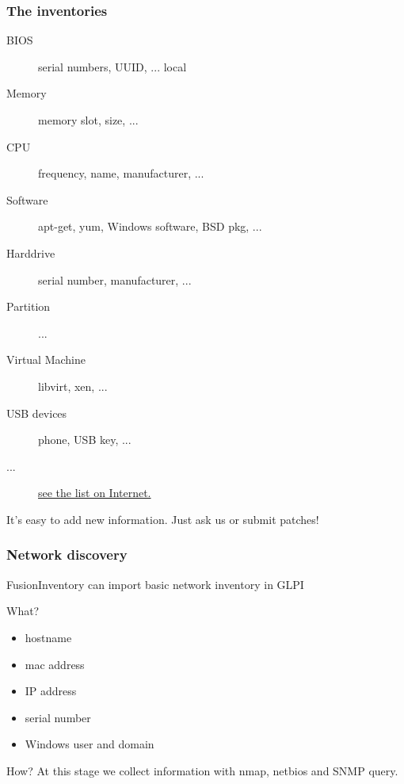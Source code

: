 \begin{frame}
    \frametitle{The inventories}

    \begin{description}
        \item[BIOS] serial numbers, UUID, ... local
        \item[Memory] memory slot, size, ...
        \item[CPU] frequency, name, manufacturer, ...
        \item[Software] apt-get, yum, Windows software, BSD pkg, ...
        \item[Harddrive] serial number, manufacturer, ...
        \item[Partition] ...
        \item[Virtual Machine] libvirt, xen, ...
        \item[USB devices] phone, USB key, ...
        \item[...] \href{http://search.cpan.org/dist/FusionInventory-Agent/lib/FusionInventory/Agent/XML/Query/Inventory.pm}{see the list on Internet.}
    \end{description}

    It's easy to add new information. Just ask us or submit patches!

\end{frame}

\begin{frame}
    \frametitle{Network discovery}

    FusionInventory can import basic network inventory in GLPI
    \begin{block}{What?}
    \begin{itemize}
        \item hostname
        \item mac address
        \item IP address
        \item serial number
        \item Windows user and domain
    \end{itemize}
    \end{block}

    \begin{block}{How?}
    At this stage we collect information with nmap, netbios and SNMP query.
    \end{block}

\end{frame}

